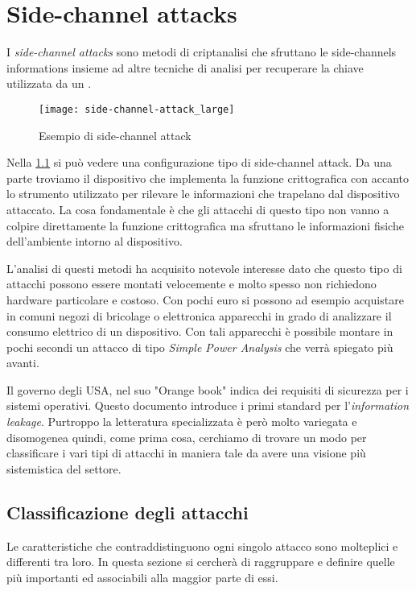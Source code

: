 \chapter{Side-channel attacks}
	I \emph{side-channel attacks} sono metodi di criptanalisi che sfruttano le side-channels informations insieme ad altre tecniche di analisi per recuperare la chiave utilizzata da un \disps\cite{standaert2010introduction}.
	
	\begin{figure}
		\begin{center}
			\texttt{[image: side-channel-attack\_large]}
			\caption{Esempio di side-channel attack}
			\label{fig:attack}
		\end{center}
	\end{figure}
	
	Nella \cref{fig:attack} si può vedere una configurazione tipo di side-channel attack. Da una parte troviamo il dispositivo che implementa la funzione crittografica con accanto lo strumento utilizzato per rilevare le informazioni che trapelano dal dispositivo attaccato. La cosa fondamentale è che gli attacchi di questo tipo non vanno a colpire direttamente la funzione crittografica ma sfruttano le informazioni fisiche dell'ambiente intorno al dispositivo.
	
	L'analisi di questi metodi ha acquisito notevole interesse dato che questo tipo di attacchi possono essere montati velocemente e molto spesso non richiedono hardware particolare e costoso. Con pochi euro si possono ad esempio acquistare in comuni negozi di bricolage o elettronica apparecchi in grado di analizzare il consumo elettrico di un dispositivo. Con tali apparecchi è possibile montare in pochi secondi un attacco di tipo \emph{Simple Power Analysis}\cite{mangard2002simple} che verrà spiegato più avanti. 
	
	Il governo degli USA, nel suo "Orange book"\cite{latham1986department} indica dei requisiti di sicurezza per i sistemi operativi. Questo documento introduce i primi standard per l'\emph{information leakage}. Purtroppo la letteratura specializzata è però molto variegata e disomogenea quindi, come prima cosa, cerchiamo di trovare un modo per classificare i vari tipi di attacchi in maniera tale da avere una visione più sistemistica del settore.
	
	\section{Classificazione degli attacchi}	
		Le caratteristiche che contraddistinguono ogni singolo attacco sono molteplici e differenti tra loro. In questa sezione si cercherà di raggruppare e definire quelle più importanti ed associabili alla maggior parte di essi.
	
